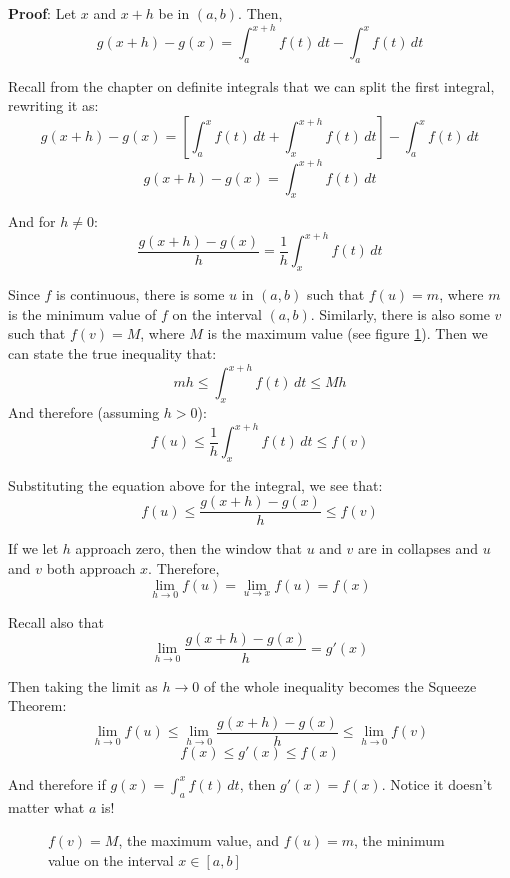 \textbf{Proof}: Let $x$ and $x + h$ be in $\left( a, b \right)$. Then,
$$g(x + h) - g(x) = \int_a^{x + h} f(t)\,dt - \int_a^x f(t)\,dt$$

Recall from the chapter on definite integrals that we can split the first integral, rewriting it as:
$$g(x + h) - g(x) = \left[ \int_a^x f(t)\,dt + \int_x^{x + h} f(t)\,dt \right] - \int_a^x f(t)\,dt$$
$$g(x + h) - g(x) = \int_x^{x + h} f(t)\,dt$$

And for $h \neq 0$:
$$\frac{g(x + h) - g(x)}{h} = \frac{1}{h}\int_x^{x + h} f(t)\,dt$$

Since $f$ is continuous, there is some $u$ in $(a, b)$ such that $f(u) = m$, where $m$ is the minimum value of $f$ on the interval $(a, b)$. Similarly, there is also some $v$ such that $f(v) = M$, where $M$ is the maximum value (see figure \ref{FTCextreme}). Then we can state the true inequality that:
$$mh \leq \int_x^{x + h} f(t) \,dt \leq Mh$$
And therefore (assuming $h > 0$):
$$f(u) \leq \frac{1}{h} \int_x^{x + h} f(t)\,dt \leq f(v)$$

Substituting the equation above for the integral, we see that:
$$f(u) \leq \frac{g(x + h) - g(x)}{h} \leq f(v)$$

If we let $h$ approach zero, then the window that $u$ and $v$ are in collapses and $u$ and $v$ both approach $x$. Therefore, 
$$\lim_{h \to 0} f(u) = \lim_{u \to x} f(u) = f(x)$$

Recall also that 
$$\lim_{h \to 0} \frac{g(x + h) - g(x)}{h} = g'(x)$$

Then taking the limit as $h \to 0$ of the whole inequality becomes the Squeeze Theorem:
$$\lim_{h \to 0} f(u) \leq \lim_{h \to 0} \frac{g(x + h) - g(x)}{h} \leq \lim_{h \to 0} f(v)$$
$$f(x) \leq g'(x) \leq f(x)$$

And therefore if $g(x) = \int_a^x f(t)\,dt$, then $g'(x) = f(x)$. Notice it doesn't matter what $a$ is!

\begin{figure}[htbp]
\centering
    \label{FTCextreme}
    \caption{$f(v) = M$, the maximum value, and $f(u) = m$, the minimum value on the interval $x \in [a, b]$}
    \end{figure}

